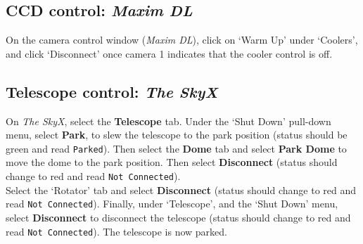 \documentclass[12pt,twoside,a4paper]{report}
\begin{document}

\subsection{CCD control: \emph{Maxim DL}}

On the camera control window (\emph{Maxim DL}), click on `Warm Up' under `Coolers', and click `Disconnect' once camera 1
indicates that the cooler control is off.

\subsection{Telescope control: \emph{The SkyX}}

On \emph{The SkyX}, select the \textbf{Telescope} tab. Under the `Shut Down' pull-down menu, select \textbf{Park}, to 
slew the telescope to the park position (status should be green and read \textcolor{PineGreen}{\tt Parked}). 
Then select the \textbf{Dome} tab and select \textbf{Park Dome} to move the dome to the park position. Then select \textbf{Disconnect} (status should change to red and read \textcolor{BrickRed}{\tt Not Connected}).\\

Select the `Rotator' tab and select \textbf{Disconnect} (status should change to red and read \textcolor{BrickRed}{\tt Not Connected}).
Finally, under `Telescope', and the `Shut Down' menu, select \textbf{Disconnect} to disconnect the telescope (status
should change to red and read \textcolor{BrickRed}{\tt Not Connected}). The telescope is now parked.
\end{document}
